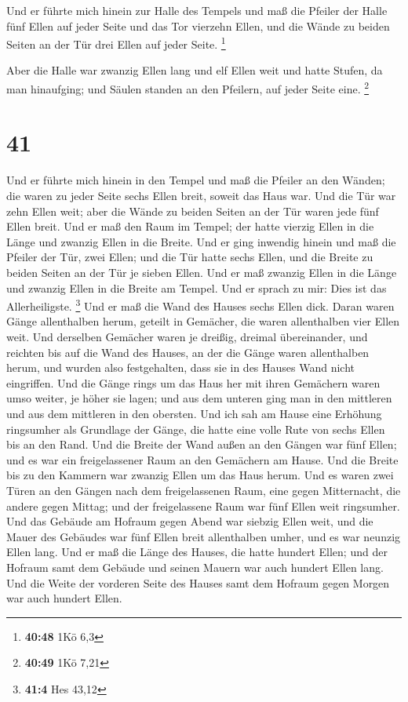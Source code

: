  Und er führte mich hinein zur Halle des Tempels und maß
die Pfeiler der Halle fünf Ellen auf jeder Seite und das Tor vierzehn
Ellen, und die Wände zu beiden Seiten an der Tür drei Ellen auf jeder
Seite. \footnote{\textbf{40:48} 1Kö 6,3}

 Aber die Halle war zwanzig Ellen lang und elf Ellen weit
und hatte Stufen, da man hinaufging; und Säulen standen an den Pfeilern,
auf jeder Seite eine. \footnote{\textbf{40:49} 1Kö 7,21}

\hypertarget{section-13}{%
\section{41}\label{section-13}}

 Und er führte mich hinein in den Tempel und maß die Pfeiler
an den Wänden; die waren zu jeder Seite sechs Ellen breit, soweit das
Haus war.  Und die Tür war zehn Ellen weit; aber die Wände
zu beiden Seiten an der Tür waren jede fünf Ellen breit. Und er maß den
Raum im Tempel; der hatte vierzig Ellen in die Länge und zwanzig Ellen
in die Breite.  Und er ging inwendig hinein und maß die
Pfeiler der Tür, zwei Ellen; und die Tür hatte sechs Ellen, und die
Breite zu beiden Seiten an der Tür je sieben Ellen.  Und er
maß zwanzig Ellen in die Länge und zwanzig Ellen in die Breite am
Tempel. Und er sprach zu mir: Dies ist das Allerheiligste. \footnote{\textbf{41:4}
  Hes 43,12}  Und er maß die Wand des Hauses sechs Ellen
dick. Daran waren Gänge allenthalben herum, geteilt in Gemächer, die
waren allenthalben vier Ellen weit.  Und derselben Gemächer
waren je dreißig, dreimal übereinander, und reichten bis auf die Wand
des Hauses, an der die Gänge waren allenthalben herum, und wurden also
festgehalten, dass sie in des Hauses Wand nicht eingriffen. 
Und die Gänge rings um das Haus her mit ihren Gemächern waren umso
weiter, je höher sie lagen; und aus dem unteren ging man in den
mittleren und aus dem mittleren in den obersten.  Und ich
sah am Hause eine Erhöhung ringsumher als Grundlage der Gänge, die hatte
eine volle Rute von sechs Ellen bis an den Rand.  Und die
Breite der Wand außen an den Gängen war fünf Ellen; und es war ein
freigelassener Raum an den Gemächern am Hause.  Und die
Breite bis zu den Kammern war zwanzig Ellen um das Haus herum.
 Und es waren zwei Türen an den Gängen nach dem
freigelassenen Raum, eine gegen Mitternacht, die andere gegen Mittag;
und der freigelassene Raum war fünf Ellen weit ringsumher. 
Und das Gebäude am Hofraum gegen Abend war siebzig Ellen weit, und die
Mauer des Gebäudes war fünf Ellen breit allenthalben umher, und es war
neunzig Ellen lang.  Und er maß die Länge des Hauses, die
hatte hundert Ellen; und der Hofraum samt dem Gebäude und seinen Mauern
war auch hundert Ellen lang.  Und die Weite der vorderen
Seite des Hauses samt dem Hofraum gegen Morgen war auch hundert Ellen.

